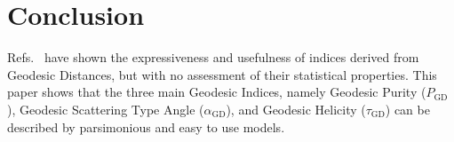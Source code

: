 \documentclass[journal]{IEEEtran}
\begin{document}
	
	
	
	\section{Conclusion}
	
	Refs.~\cite{ClassificationPolSARGeodesic,AGeneralizedVolumeScatteringModelBasedVegetationIndexfromPolarimetricSARData2019,NovelTechniquesforBuiltupAreaExtractionfromPolarimetricSARImages2019,APolSARScatteringPowerFactorizationFrameworkandNovelRollInvariantParametersBasedUnsupervisedClassificationSchemeUsingaGeodesicDistanceinpress,ChangeDetectionPolSARGeodesicDistanceBetweenScatteringMechanisms,ARadarVegetationIndexforCropMonitoringUsingCompactPolarimetricSARData}
	have shown the expressiveness and usefulness of indices derived from Geodesic Distances, but with no assessment of their statistical properties.
	This paper shows that the three main Geodesic Indices, namely
	Geodesic Purity ($P_{\text{GD}}$),
	Geodesic Scattering Type Angle ($\alpha_{\text{GD}}$), and
	Geodesic Helicity ($\tau_{\text{GD}}$) can be described by parsimonious and easy to use models.
	
\end{document}
